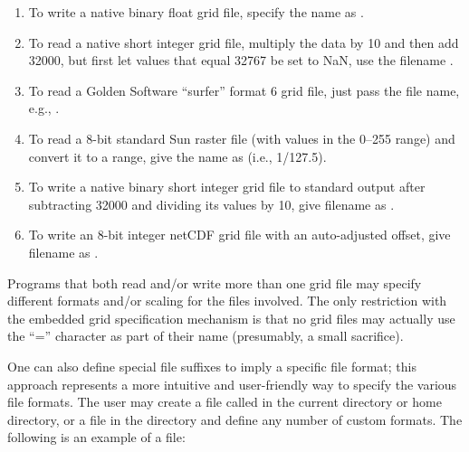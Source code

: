 \begin{enumerate}
\item To write a native binary float grid file, specify the name as .

\item To read a native short integer grid file, multiply the data by 10 and then
add 32000, but first let values that equal 32767 be set to NaN,
use the filename .

\item To read a Golden Software ``surfer'' format 6 grid file, just pass the file name,
e.g., .

\item To read a 8-bit standard Sun raster file (with values in the 0--255 range)
and convert it to a  range, give the name as
 (i.e., 1/127.5).

\item To write a native binary short integer grid file to standard output after subtracting
32000 and dividing its values by 10, give filename as .

\item To write an 8-bit integer netCDF grid file with an
  auto-adjusted offset, give filename as .

\end{enumerate}

Programs that both read and/or write more than one grid file may
specify different formats and/or scaling for the files involved.
The only restriction with the embedded grid specification mechanism
is that no grid files may actually use the ``=''
character as part of their name (presumably, a small sacrifice).


One can also define special file suffixes to imply a specific file
format; this approach represents a more intuitive and
user-friendly way to specify the various file formats.  The user
may create a file called  in the current
directory or home directory, or a file  in the
directory  and define any number of custom
formats.  The following is an example of a 
file: 

\vspace{\baselineskip}

